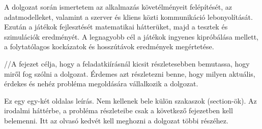 A dolgozat során ismertetem az alkalmazás követélményeit felépítését, az adatmodelleket, valamint a szerver és kliens közti kommunikáció lebonyolítását. Ezután a játékok fejlesztését
matematikai hátterüket, majd a tesztek és szimulációk eredményét. A legnagyobb cél a játékok ingyenes kipróbálása mellett, a folytatólagos kockázatok és hosszútávok eredmények megértetése.







































//A fejezet célja, hogy a feladatkiírásnál kicsit részletesebben bemutassa, hogy miről fog szólni a dolgozat.
Érdemes azt részletezni benne, hogy milyen aktuális, érdekes és nehéz probléma megoldására vállalkozik a dolgozat.

Ez egy egy-két oldalas leírás.
Nem kellenek bele külön szakaszok (section-ök).
Az irodalmi háttérbe, a probléma részleteibe csak a következő fejezetben kell belemenni.
Itt az olvasó kedvét kell meghozni a dolgozat többi részéhez.
